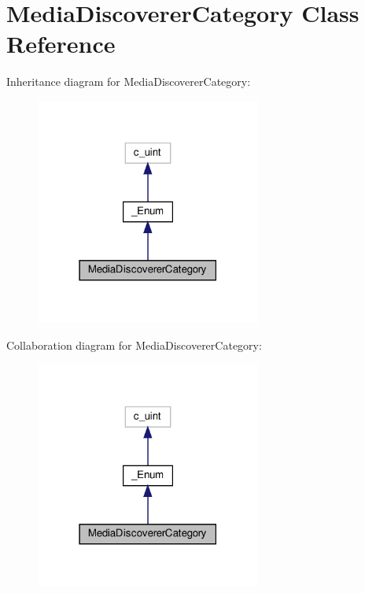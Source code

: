 \hypertarget{classvlc_1_1_media_discoverer_category}{}\section{Media\+Discoverer\+Category Class Reference}
\label{classvlc_1_1_media_discoverer_category}


Inheritance diagram for Media\+Discoverer\+Category\+:
\nopagebreak
\begin{figure}[H]
\begin{center}
\leavevmode
\includegraphics[width=210pt]{classvlc_1_1_media_discoverer_category__inherit__graph}
\end{center}
\end{figure}


Collaboration diagram for Media\+Discoverer\+Category\+:
\nopagebreak
\begin{figure}[H]
\begin{center}
\leavevmode
\includegraphics[width=210pt]{classvlc_1_1_media_discoverer_category__coll__graph}
\end{center}
\end{figure}
